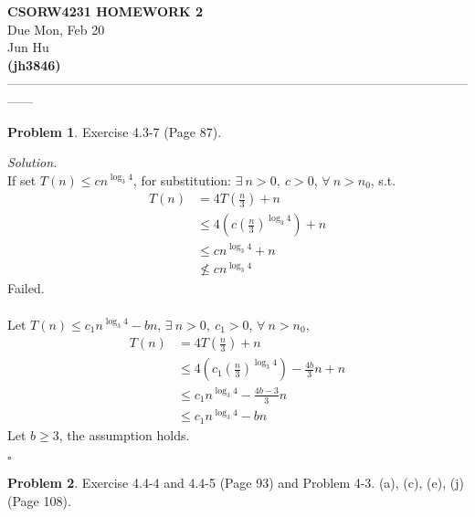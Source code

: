 \documentclass[11pt]{article}
\theoremstyle{definition}
\newtheorem{problem}{Problem}
\newenvironment{solution}{\noindent\emph{Solution.}}{\hfill$\square$}
\begin{document}
\begin{center}
\Large{} 
\textbf{CSORW4231 HOMEWORK 2} \\
\normalsize{}
Due Mon, Feb 20 \\
\large{Jun Hu \\
\textbf{(jh3846)}} \\ 
------------------------------------------------------------------------------------------------------------------
\end{center}

\begin{problem}
\large{Exercise 4.3-7 (Page 87).}
\end{problem}

\begin{solution}
\\
If set $T(n) \leq cn^{\log _3 4}$, for  substitution: $\exists \ n>0, \ c>0$, $\forall \ n>n_0$, s.t.
\begin{align*}
T(n)&=4T(\frac{n}{3}) + n \\
&\leq 4(c(\frac{n}{3})^{\log _3 4}) + n \\
&\leq cn^{\log _3 4} + n \\
&\nleq cn^{\log _3 4}
\end{align*}
Failed.\\ \\
Let $T(n) \leq c_1n^{\log _3 4} - bn$, $\exists \ n>0, \ c_1>0$, $\forall \ n>n_0$,
\begin{align*}
T(n)&=4T(\frac{n}{3}) + n \\
&\leq 4(c_1(\frac{n}{3})^{\log _3 4}) - \frac{4b}{3}n + n \\
&\leq c_1n^{\log _3 4} - \frac{4b-3}{3}n \\
&\leq c_1n^{\log _3 4} - bn
\end{align*}
Let $b \geq 3$, the assumption holds.

\end{solution}

\newpage



\begin{problem}
Exercise 4.4-4 and 4.4-5 (Page 93) and Problem 4-3. (a), (c), (e), (j) (Page 108).
\end{problem}
\end{document}
